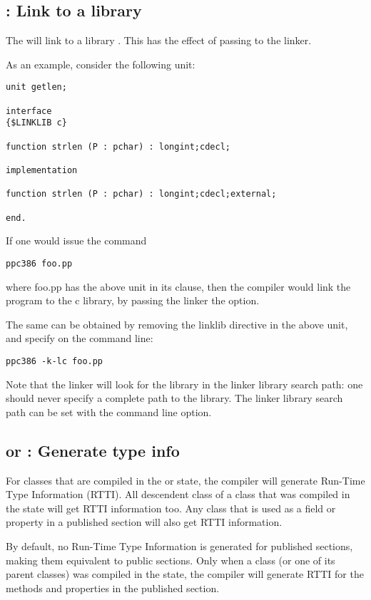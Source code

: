\subsection{ : Link to a library}
\label{se:linklib}

The  will link to a library .
This has the effect of passing  to the linker.

As an example, consider the following unit:
\begin{verbatim}
unit getlen;

interface
{$LINKLIB c}

function strlen (P : pchar) : longint;cdecl;

implementation

function strlen (P : pchar) : longint;cdecl;external;

end.
\end{verbatim}
If one would issue the command
\begin{verbatim}
ppc386 foo.pp
\end{verbatim}
where foo.pp has the above unit in its  clause,
then the compiler would link the program to the c library, by passing the
linker the  option.

The same can be obtained by removing the linklib directive in the
above unit, and specify  on the command line:
\begin{verbatim}
ppc386 -k-lc foo.pp
\end{verbatim}
Note that the linker will look for the library in the linker library search path:
one should never specify a complete path to the library.
The linker library search path can be set with the  command line option.

\subsection{ or  : Generate type info}

For classes that are compiled in the  or 
state, the compiler will generate Run-Time Type Information (RTTI). All
descendent class of a class that was compiled in the  state
will get RTTI information too. Any class that is used as a field or property 
in a published section will also get RTTI information.

By default, no Run-Time Type Information is generated for published
sections, making them equivalent to public sections. Only when a class
(or one of its parent classes) was compiled in the  state, the
compiler will generate RTTI for the methods and properties in the published
section.

